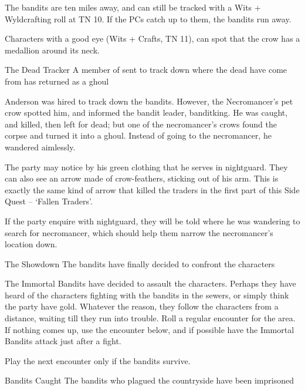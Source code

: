 \begin{multicols}{2}
\begin{boxtext}
\end{boxtext}

The bandits are ten miles away, and can still be tracked with a Wits + Wyldcrafting roll at TN 10.
If the PCs catch up to them, the bandits run away.

Characters with a good eye (Wits + Crafts, TN 11), can spot that the crow has a medallion around its neck.

{The Dead Tracker}%
{A member of  sent to track down where the dead have come from has returned as a ghoul}%

Anderson was hired to track down the bandits.
However, the Necromancer's pet crow spotted him, and informed the bandit leader, \gls{banditking}.
He was caught, and killed, then left for dead; but one of the necromancer's crows found the corpse and turned it into a ghoul.
Instead of going to the necromancer, he wandered aimlessly.

The party may notice by his green clothing that he serves in \gls{nightguard}.
They can also see an arrow made of crow-feathers, sticking out of his arm.
This is exactly the same kind of arrow that killed the traders in the first part of this Side Quest -- `Fallen Traders'.


If the party enquire with \gls{nightguard}, they will be told where he was wandering to search for \gls{necromancer}, which should help them narrow the necromancer's location down.

{The Showdown}%
{The bandits have finally decided to confront the characters}%

The Immortal Bandits have decided to assault the characters.
Perhaps they have heard of the characters fighting with the bandits in the sewers, or simply think the party have gold.
Whatever the reason, they follow the characters from a distance, waiting till they run into trouble.
Roll a regular encounter for the area.
If nothing comes up, use the encounter below, and if possible have the Immortal Bandits attack just after a fight.


\banditking

Play the next encounter only if the bandits survive.

\resumecontents[Town]

{Bandits Caught}%
{The bandits who plagued the countryside have been imprisoned}%


\end{multicols}
